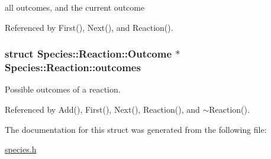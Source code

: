 all outcomes, and the current outcome 



Referenced by First(), Next(), and Reaction().\hypertarget{structSpecies_1_1Reaction_f7ceec44369f69484487759d39ef9295}{
\subsubsection[{outcomes}]{\setlength{\rightskip}{0pt plus 5cm}struct {\bf Species::Reaction::Outcome}	$\ast$ {\bf Species::Reaction::outcomes}}}
\label{structSpecies_1_1Reaction_f7ceec44369f69484487759d39ef9295}


Possible outcomes of a reaction. 



Referenced by Add(), First(), Next(), Reaction(), and $\sim$Reaction().

The documentation for this struct was generated from the following file:\begin{CompactItemize}
\item 
\hyperlink{species_8h}{species.h}\end{CompactItemize}
